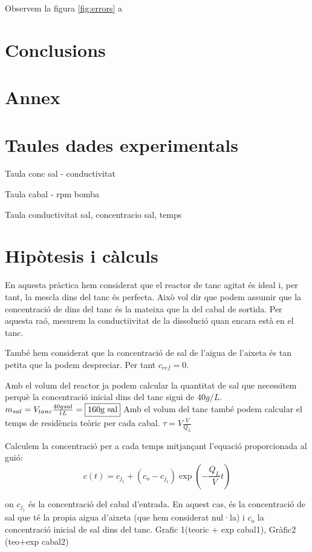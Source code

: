 \documentclass[10pt, twoside]{article}
\begin{document}
Observem la figura \ref{fig:errors} a

\section{Conclusions}

\section*{Annex}

\appendix

\section{Taules dades experimentals}

Taula conc sal - conductivitat

Taula cabal - rpm bomba

Taula conductivitat sal, concentracio sal, temps

\section{Hipòtesis i càlculs}

En aquesta pràctica hem considerat que el reactor de tanc agitat és ideal i, per tant, la mescla dins del tanc és perfecta. Això vol dir que podem assumir que la concentració de dins del tanc és la mateixa que la del cabal de sortida. Per aquesta raó, mesurem la conductiivitat de la dissolució quan encara està en el tanc.

També hem considerat que la concentració de sal de l'aigua de l'aixeta és tan petita que la podem despreciar. Per tant $c_{ref} = 0$.

Amb el volum del reactor ja podem calcular la quantitat de sal que necessitem perquè la concentració inicial dins del tanc sigui de $40g/L$. 
    $m_{sal} = V_{tanc}\frac{40g sal}{1L} = \fbox{160g sal}$
Amb el volum del tanc també podem calcular el temps de residència teòric per cada cabal.
    $\tau = V\frac{V}{Q_L}$

Calculem la concentració per a cada temps mitjançant l'equació proporcionada al guió:
\begin{equation}
    c(t) = c_{j_1} + (c_o-c_{j_1})\exp\left(-\frac{Q_L}{V}t\right) 
    \label{c(t)}   
\end{equation}

on $c_{j_1}$ és la concentració del cabal d'entrada. En aquest cas, és la concentració de sal que té la propia aigua d'aixeta (que hem considerat nul·la) i $c_o$ la concentració inicial de sal dins del tanc.
Grafic 1(teoric + exp cabal1), Gràfic2 (teo+exp cabal2)
\end{document}
